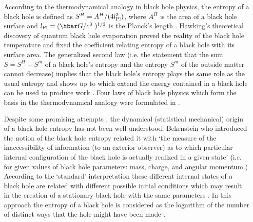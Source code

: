 \documentclass[superscriptaddress,showpacs,preprintnumbers,amsmath,amssymb,
nofootinbib,aps,prd,12pt]{revtex4-1}
\begin{document}
\maketitle
\newpage

According to the  thermodynamical analogy in  black hole physics,  the
entropy of a black hole  is defined as
$S^H =A^H  /(4l_{\mbox{\scriptsize{Pl}}}^2)$,
where   $A^H$   is   the   area   of   a   black   hole   surface  and
$l_{\mbox{\scriptsize{Pl}}}=(\hbar G/c^3~)^{1/2}$ is the Planck's length
\cite{Beke:72,Beke:73}. Hawking's theoretical discovery \cite{Hawk:75}
of quantum black hole  evaporation proved the  reality of the  black hole
temperature and   fixed the  coefficient relating  entropy of  a black
hole with  its surface  area.   The generalized  second law  (i.e. the
statement that the sum $S=S^H +S^m$ of a black hole's entropy and  the
entropy $S^m$ of the outside matter cannot decrease) implies that  the
black hole's  entropy plays  the same  role as  the usual  entropy and
shows up to which extend the  energy contained in a black hole  can be
used to produce work  \cite{Beke:72,Beke:73,Beke:74}. Four laws of black
hole physics which form the basis in the thermodynamical analogy  were
formulated in \cite{BaCaHa:73}.


Despite some promising attempts
\cite{Beke:73,Beke:80,York:83,ZuTh:85,ThPrMa:86}, the dynamical
(statistical mechanical) origin of a black hole entropy has not been
well understood.  Bekenstein \cite{Beke:73} who introduced the notion of
the  black  hole  entropy  related   it  with  `the  measure  of   the
inaccessibility of information (to  an exterior observer) as  to which
particular  internal  configuration  of  the  black  hole  is actually
realized in  a given  state' (i.e.   for given  values of  black  hole
parameters: mass,  charge, and  angular momentum.)   According to  the
`standard' interpretation  these different  internal states  of a
black hole are related with different possible initial conditions
which  may result  in  the  creation  of  a  stationary  black hole
with the same parameters \cite{Beke:73}.  In this  approach the
entropy    of a black   hole   is  considered     as  the  logarithm
of the number of distinct   ways    that    the   hole    might
have   been     made \cite{ZuTh:85,ThPrMa:86}.
\end{document}

